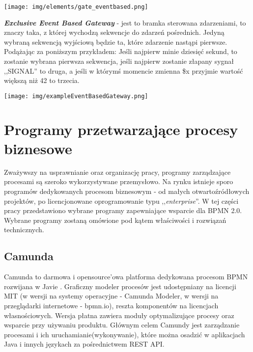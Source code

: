 \documentclass[declaration,shortabstract,mgr]{iithesis}
\newcommand{\bpmn}{BPMN }
\begin{document}
\vspace{\mypointsep}

\noindent\begin{minipage}[t]{0.075\textwidth}\vspace{0pt}
\texttt{[image: img/elements/gate\_eventbased.png]}
\end{minipage}\hfill
\begin{minipage}[t]{0.875\textwidth}\vspace{0pt}
\textbf{\textit{Exclusive Event Based Gateway}} - jest to bramka sterowana zdarzeniami, to znaczy taka, z której wychodzą sekwencje do zdarzeń pośrednich. Jedyną wybraną sekwencją wyjściową będzie ta, które zdarzenie nastąpi pierwsze. Podążając za poniższym przykładem: Jeśli najpierw minie dziesięć sekund, to zostanie wybrana pierwsza sekwencja, jeśli najpierw zostanie złapany sygnał ,,SIGNAL'' to druga, a jeśli w którymś momencie zmienna \$x przyjmie wartość większą niż 42 to trzecia.
\begin{center}
\texttt{[image: img/exampleEventBasedGateway.png]}
\end{center}
\end{minipage}

\vspace{\mypointsep}


\chapter{Programy przetwarzające procesy biznesowe}\label{chapter-programs}

Zważywszy na usprawnianie oraz organizację pracy, programy zarządzające procesami są szeroko wykorzystywane przemysłowo. Na rynku istnieje sporo programów dedykowanych procesom biznesowym - od małych otwartoźródłowych projektów, po licencjonowane oprogramowanie typu ,,\textit{enterprise}''. W tej części pracy przedstawiono wybrane programy zapewniające wsparcie dla \bpmn 2.0. Wybrane programy zostaną omówione pod kątem właściwości i rozwiązań technicznych.

\section{Camunda}
Camunda to  darmowa i opensource'owa platforma dedykowana procesom \bpmn rozwijana w Javie \cite{wiki-camunda}. Graficzny modeler procesów jest udostępniany na licencji MIT (w wersji na systemy operacyjne - Camunda Modeler, w wersji na przeglądarki internetowe - bpmn.io), reszta komponentów na licencjach własnościowych. Wersja płatna zawiera moduły optymalizujące procesy oraz wsparcie przy używaniu produktu. Głównym celem Camundy jest zarządzanie procesami i ich uruchamianie(wykonywanie), które można osadzić w aplikacjach Java i innych językach za pośrednictwem REST API.
\end{document}
